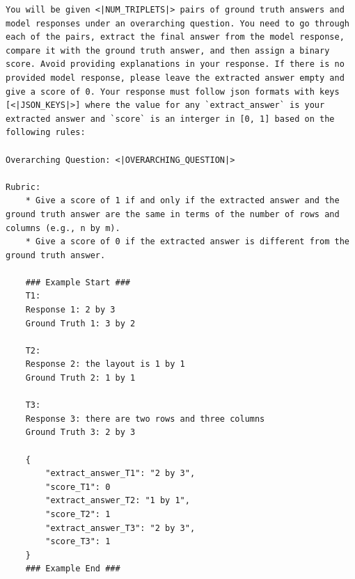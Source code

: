 \newpage
\begin{example}
\begin{lstlisting}
You will be given <|NUM_TRIPLETS|> pairs of ground truth answers and model responses under an overarching question. You need to go through each of the pairs, extract the final answer from the model response, compare it with the ground truth answer, and then assign a binary score. Avoid providing explanations in your response. If there is no provided model response, please leave the extracted answer empty and give a score of 0. Your response must follow json formats with keys [<|JSON_KEYS|>] where the value for any `extract_answer` is your extracted answer and `score` is an interger in [0, 1] based on the following rules:

Overarching Question: <|OVERARCHING_QUESTION|>

Rubric:
    * Give a score of 1 if and only if the extracted answer and the ground truth answer are the same in terms of the number of rows and columns (e.g., n by m).
    * Give a score of 0 if the extracted answer is different from the ground truth answer.

    ### Example Start ###
    T1:
    Response 1: 2 by 3
    Ground Truth 1: 3 by 2

    T2:
    Response 2: the layout is 1 by 1
    Ground Truth 2: 1 by 1

    T3:
    Response 3: there are two rows and three columns
    Ground Truth 3: 2 by 3

    {
        "extract_answer_T1": "2 by 3",
        "score_T1": 0
        "extract_answer_T2: "1 by 1",
        "score_T2": 1
        "extract_answer_T3": "2 by 3",
        "score_T3": 1
    }
    ### Example End ###
\end{lstlisting} 
\end{example}